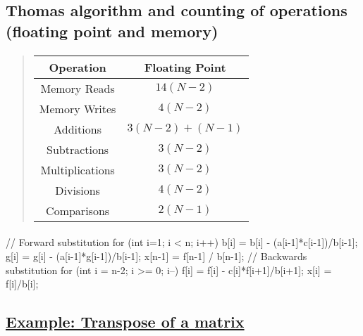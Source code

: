 \documentclass[%
oneside,                 %
final,                   %
10pt]{article}
\begin{document}
\subsection{Thomas algorithm and counting of operations (floating point and memory)}

\paragraph{}



\begin{quote}
\begin{tabular}{cc}
\hline
\multicolumn{1}{c}{ Operation } & \multicolumn{1}{c}{ Floating Point } \\
\hline
Memory Reads    & $14(N-2)$        \\
Memory Writes   & $4(N-2)$         \\
Additions       & $3(N-2) + (N-1)$ \\
Subtractions    & $3(N-2)$         \\
Multiplications & $3(N-2)$         \\
Divisions       & $4(N-2)$         \\
Comparisons     & $2(N-1)$         \\
\hline
\end{tabular}
\end{quote}

\noindent




\paragraph{}
\bcppcod
    // Forward substitution                                                                       
    for (int i=1; i < n; i++) {
      b[i] = b[i] - (a[i-1]*c[i-1])/b[i-1];
      g[i] = g[i] - (a[i-1]*g[i-1])/b[i-1];
    }
    x[n-1] = f[n-1] / b[n-1];
    // Backwards substitution                                                           
    for (int i = n-2; i >= 0; i--) {
      f[i] = f[i] - c[i]*f[i+1]/b[i+1];
      x[i] = f[i]/b[i];
    }
\ecppcod




\subsection{\href{{https://github.com/CompPhysics/ComputationalPhysicsMSU/blob/master/doc/Programs/LecturePrograms/programs/Classes/cpp/program8.cpp}}{Example: Transpose of a matrix}}
\end{document}

